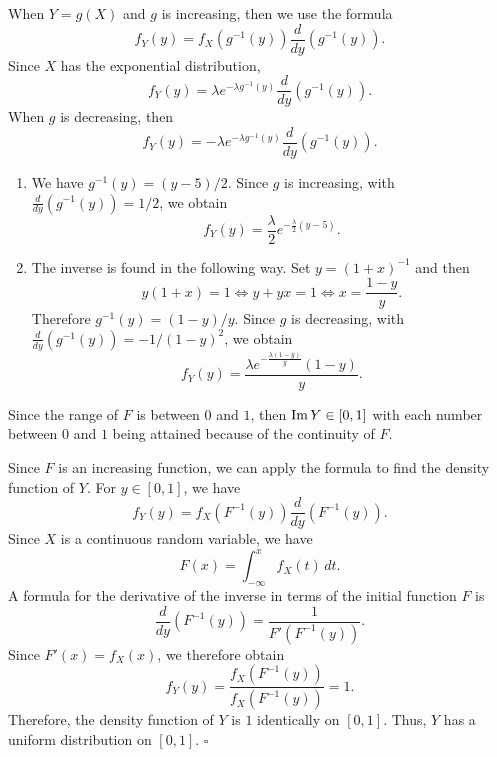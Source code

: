 \begin{problem}
When $Y = g (X)$ and $g$ is increasing, then we use the formula
    \[
        f_Y (y) = f_X (g^{-1} (y)) \frac{d}{dy} (g^{-1} (y)) .
    \]
Since $X$ has the exponential distribution,
    \[
        f_Y (y) = \lambda e^{-\lambda g^{-1} (y)} \frac{d}{dy} (g^{-1} (y)) .
    \]
When $g$ is decreasing, then
    \[
        f_Y (y) = - \lambda e^{-\lambda g^{-1} (y)} \frac{d}{dy} (g^{-1} (y)) .
    \]

    \begin{enumerate}[label=\alph*)]
        \item We have $g^{-1} (y) = (y - 5)/2$. Since $g$ is increasing, with $\frac{d}{dy} (g^{-1} (y)) = 1/2$, we obtain
            \[
                f_Y (y) = \frac{\lambda}{2} e^{-\frac{\lambda}{2} (y - 5)} .
            \]
        \item The inverse is found in the following way. Set $y = (1 + x)^{-1}$ and then
            \[
                y (1 + x) = 1 \iff y + yx = 1 \iff x = \frac{1 - y}{y} .
            \]
        Therefore $g^{-1} (y) = (1 - y)/y$. Since $g$ is decreasing, with $\frac{d}{dy} (g^{-1} (y)) = -1/(1-y)^2$, we obtain
            \[
                f_Y (y) = \frac{\lambda e^{-\frac{\lambda (1 - y)}{y}} (1 - y)}{y}. \tag*{$\square$}
            \]
    \end{enumerate}
\end{problem}

\begin{problem}
Since the range of $F$ is between $0$ and $1$, then $\operatorname{Im} Y \in [0, 1]$ with each number between $0$ and $1$ being attained because of the continuity of $F$.

Since $F$ is an increasing function, we can apply the formula to find the density function of $Y$. For $y \in [0, 1]$, we have
    \[
        f_Y (y) = f_X (F^{-1} (y)) \frac{d}{dy} (F^{-1} (y)) .
    \]
Since $X$ is a continuous random variable, we have 
    \[
        F(x) = \int_{-\infty}^x f_X (t) \, dt .
    \]
A formula for the derivative of the inverse in terms of the initial function $F$ is
    \[
        \frac{d}{dy} (F^{-1} (y)) = \frac{1}{F' (F^{-1} (y))} .
    \]
Since $F' (x) = f_X (x)$, we therefore obtain
    \[
        f_Y (y) = \frac{f_X (F^{-1} (y))}{f_X (F^{-1} (y))} = 1 .
    \]
Therefore, the density function of $Y$ is $1$ identically on $[0, 1]$. Thus, $Y$ has a uniform distribution on $[0, 1]$. \hfill $\square$
\end{problem}

